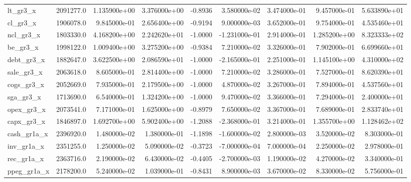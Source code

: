\documentclass[10pt]{article}
\begin{document}
\begin{landscape}
\begin{longtable}{|l|r|r|r|r|r|r|r|r|}
lt\_gr3\_x                &  2091277.0 &  1.135900e+00 &  3.376000e+00 &     -0.8936 &  3.580000e-02 &  3.474000e-01 &  9.457000e-01 &  5.633890e+01 \\
cl\_gr3\_x                &  1906078.0 &  9.845000e-01 &  2.656400e+00 &     -0.9194 &  9.000000e-03 &  3.652000e-01 &  9.754000e-01 &  4.535460e+01 \\
ncl\_gr3\_x               &  1803330.0 &  4.168200e+00 &  2.242620e+01 &     -1.0000 & -1.231000e-01 &  2.914000e-01 &  1.285200e+00 &  8.323333e+02 \\
be\_gr3\_x                &  1998122.0 &  1.009400e+00 &  3.275200e+00 &     -0.9384 &  7.210000e-02 &  3.326000e-01 &  7.902000e-01 &  6.699660e+01 \\
debt\_gr3\_x              &  1882647.0 &  3.622500e+00 &  2.086590e+01 &     -1.0000 & -2.165000e-01 &  2.251000e-01 &  1.145100e+00 &  4.310000e+02 \\
sale\_gr3\_x              &  2063618.0 &  8.605000e-01 &  2.814400e+00 &     -1.0000 &  7.210000e-02 &  3.286000e-01 &  7.527000e-01 &  8.620390e+01 \\
cogs\_gr3\_x              &  2052669.0 &  7.935000e-01 &  2.179500e+00 &     -1.0000 &  4.870000e-02 &  3.267000e-01 &  7.894000e-01 &  4.537560e+01 \\
sga\_gr3\_x               &  1713690.0 &  6.540000e-01 &  1.324200e+00 &     -1.0000 &  9.470000e-02 &  3.366000e-01 &  7.294000e-01 &  2.400000e+01 \\
opex\_gr3\_x              &  2073541.0 &  7.171000e-01 &  1.625000e+00 &     -0.8979 &  7.650000e-02 &  3.367000e-01 &  7.689000e-01 &  2.833740e+01 \\
capx\_gr3\_x              &  1846897.0 &  1.692700e+00 &  5.902400e+00 &     -1.2088 & -2.368000e-01 &  3.214000e-01 &  1.355700e+00 &  1.128462e+02 \\
cash\_gr1a\_x             &  2396920.0 &  1.480000e-02 &  1.380000e-01 &     -1.1898 & -1.600000e-02 &  2.800000e-03 &  3.520000e-02 &  8.303000e-01 \\
inv\_gr1a\_x              &  2351255.0 &  1.250000e-02 &  5.090000e-02 &     -0.3723 & -7.000000e-04 &  7.000000e-04 &  2.250000e-02 &  2.978000e-01 \\
rec\_gr1a\_x              &  2363716.0 &  2.190000e-02 &  6.430000e-02 &     -0.4405 & -2.700000e-03 &  1.190000e-02 &  4.270000e-02 &  3.340000e-01 \\
ppeg\_gr1a\_x             &  2178200.0 &  5.240000e-02 &  1.039000e-01 &     -0.8431 &  8.900000e-03 &  3.670000e-02 &  8.330000e-02 &  5.756000e-01 \\

\end{longtable}
\end{landscape}
\end{document}
